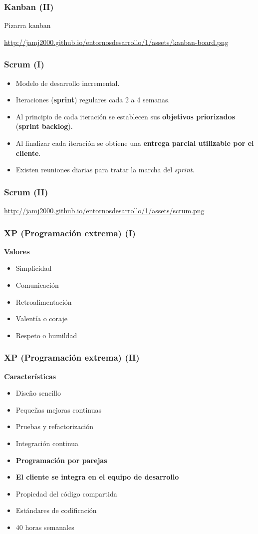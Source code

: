 \documentclass[a4paper]{article}
\begin{document}
\subsubsection{\textbf{Kanban (II)}}
\label{kanban-ii}
Pizarra kanban

\url{http://jamj2000.github.io/entornosdesarrollo/1/assets/kanban-board.png}
\subsubsection{\textbf{Scrum (I)}}
\label{scrum-i}
\begin{itemize}
\item Modelo de desarrollo incremental.
\item Iteraciones (\textbf{sprint}) regulares cada 2 a 4 semanas.
\item Al principio de cada iteración se establecen sus \textbf{objetivos
priorizados} (\textbf{sprint backlog}).
\item Al finalizar cada iteración se obtiene una \textbf{entrega parcial utilizable
por el cliente}.
\item Existen reuniones diarias para tratar la marcha del \emph{sprint}.
\end{itemize}
\subsubsection{\textbf{Scrum (II)}}
\label{scrum-ii}
\url{http://jamj2000.github.io/entornosdesarrollo/1/assets/scrum.png}
\subsubsection{\textbf{XP (Programación extrema) (I)}}
\label{xp-programación-extrema-i}
\textbf{Valores}

\begin{itemize}
\item Simplicidad
\item Comunicación
\item Retroalimentación
\item Valentía o coraje
\item Respeto o humildad
\end{itemize}
\subsubsection{\textbf{XP (Programación extrema) (II)}}
\label{xp-programación-extrema-ii}
\textbf{Características}

\begin{itemize}
\item Diseño sencillo
\item Pequeñas mejoras continuas
\item Pruebas y refactorización
\item Integración continua
\item \textbf{Programación por parejas}
\item \textbf{El cliente se integra en el equipo de desarrollo}
\item Propiedad del código compartida
\item Estándares de codificación
\item 40 horas semanales
\end{itemize}
\end{document}

